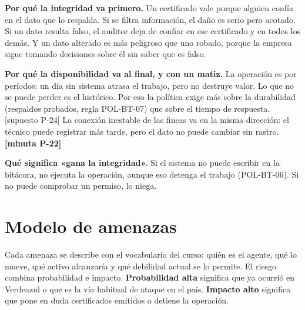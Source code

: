 \documentclass[11pt,letterpaper]{article}
\newcommand{\resp}[1]{\textrm{\footnotesize\bfseries [minuta #1]}}
\newcommand{\supu}[1]{\textrm{\footnotesize [supuesto #1]}}
\begin{document}
\textbf{Por qué la integridad va primero.} Un certificado vale porque alguien confía en el dato que lo
respalda. Si se filtra información, el daño es serio pero acotado. Si un dato resulta falso, el auditor
deja de confiar en ese certificado y en todos los demás. Y un dato alterado es más peligroso que uno
robado, porque la empresa sigue tomando decisiones sobre él sin saber que es falso.

\textbf{Por qué la disponibilidad va al final, y con un matiz.} La operación es por períodos: un día sin
sistema atrasa el trabajo, pero no destruye valor. Lo que no se puede perder es el histórico. Por eso la
política exige más sobre la durabilidad (respaldos probados, regla POL-BT-07) que sobre el tiempo de
respuesta. \supu{P-24} La conexión inestable de las fincas va en la misma dirección: el técnico puede
registrar más tarde, pero el dato no puede cambiar sin rastro. \resp{P-22}

\textbf{Qué significa «gana la integridad».} Si el sistema no puede escribir en la bitácora, no ejecuta
la operación, aunque eso detenga el trabajo (POL-BT-06). Si no puede comprobar un permiso, lo niega.

\section{Modelo de amenazas}
\label{sec:amenazas}

Cada amenaza se describe con el vocabulario del curso: quién es el agente, qué lo mueve, qué activo
alcanzaría y qué debilidad actual se lo permite. El riesgo combina probabilidad e impacto.
\textbf{Probabilidad alta} significa que ya ocurrió en Verdeazul o que es la vía habitual de ataque en el
país. \textbf{Impacto alto} significa que pone en duda certificados emitidos o detiene la operación.
\end{document}

